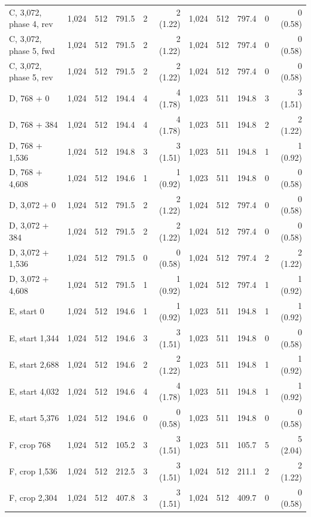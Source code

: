 \begin{tabular}{@{}l rrrrr@{\hspace{4pt}}rrrrr@{}}
C, 3{,}072, phase 4, rev & 1{,}024 & 512 & 791.5 & 2 & 2 (1.22) & 1{,}024 & 512 & 797.4 & 0 & 0 (0.58) \\
C, 3{,}072, phase 5, fwd & 1{,}024 & 512 & 791.5 & 2 & 2 (1.22) & 1{,}024 & 512 & 797.4 & 0 & 0 (0.58) \\
C, 3{,}072, phase 5, rev & 1{,}024 & 512 & 791.5 & 2 & 2 (1.22) & 1{,}024 & 512 & 797.4 & 0 & 0 (0.58) \\
\midrule
D, 768 + 0 & 1{,}024 & 512 & 194.4 & 4 & 4 (1.78) & 1{,}023 & 511 & 194.8 & 3 & 3 (1.51) \\
D, 768 + 384 & 1{,}024 & 512 & 194.4 & 4 & 4 (1.78) & 1{,}023 & 511 & 194.8 & 2 & 2 (1.22) \\
D, 768 + 1{,}536 & 1{,}024 & 512 & 194.8 & 3 & 3 (1.51) & 1{,}023 & 511 & 194.8 & 1 & 1 (0.92) \\
D, 768 + 4{,}608 & 1{,}024 & 512 & 194.6 & 1 & 1 (0.92) & 1{,}023 & 511 & 194.8 & 0 & 0 (0.58) \\
D, 3{,}072 + 0 & 1{,}024 & 512 & 791.5 & 2 & 2 (1.22) & 1{,}024 & 512 & 797.4 & 0 & 0 (0.58) \\
D, 3{,}072 + 384 & 1{,}024 & 512 & 791.5 & 2 & 2 (1.22) & 1{,}024 & 512 & 797.4 & 0 & 0 (0.58) \\
D, 3{,}072 + 1{,}536 & 1{,}024 & 512 & 791.5 & 0 & 0 (0.58) & 1{,}024 & 512 & 797.4 & 2 & 2 (1.22) \\
D, 3{,}072 + 4{,}608 & 1{,}024 & 512 & 791.5 & 1 & 1 (0.92) & 1{,}024 & 512 & 797.4 & 1 & 1 (0.92) \\
\midrule
E, start 0 & 1{,}024 & 512 & 194.6 & 1 & 1 (0.92) & 1{,}023 & 511 & 194.8 & 1 & 1 (0.92) \\
E, start 1{,}344 & 1{,}024 & 512 & 194.6 & 3 & 3 (1.51) & 1{,}023 & 511 & 194.8 & 0 & 0 (0.58) \\
E, start 2{,}688 & 1{,}024 & 512 & 194.6 & 2 & 2 (1.22) & 1{,}023 & 511 & 194.8 & 1 & 1 (0.92) \\
E, start 4{,}032 & 1{,}024 & 512 & 194.6 & 4 & 4 (1.78) & 1{,}023 & 511 & 194.8 & 1 & 1 (0.92) \\
E, start 5{,}376 & 1{,}024 & 512 & 194.6 & 0 & 0 (0.58) & 1{,}023 & 511 & 194.8 & 0 & 0 (0.58) \\
\midrule
F, crop 768 & 1{,}024 & 512 & 105.2 & 3 & 3 (1.51) & 1{,}023 & 511 & 105.7 & 5 & 5 (2.04) \\
F, crop 1{,}536 & 1{,}024 & 512 & 212.5 & 3 & 3 (1.51) & 1{,}024 & 512 & 211.1 & 2 & 2 (1.22) \\
F, crop 2{,}304 & 1{,}024 & 512 & 407.8 & 3 & 3 (1.51) & 1{,}024 & 512 & 409.7 & 0 & 0 (0.58) \\
\bottomrule
\end{tabular}
